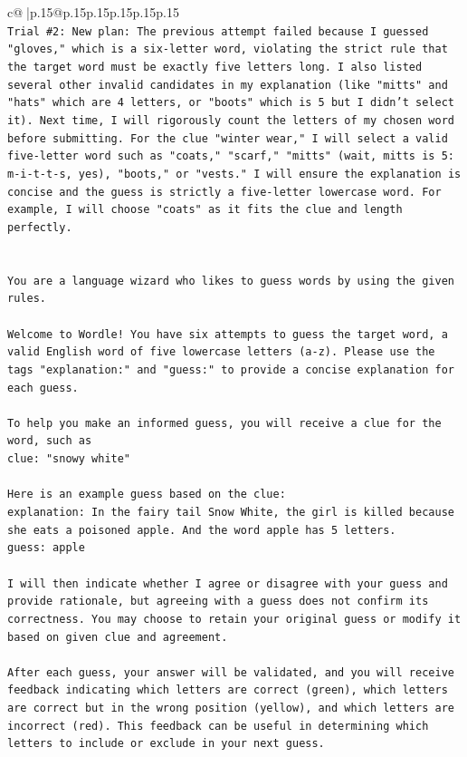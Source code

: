 \documentclass{article}
\begin{document}
{\begin{supertabular}{c@{$\;$}|p{.15\linewidth}@{}p{.15\linewidth}p{.15\linewidth}p{.15\linewidth}p{.15\linewidth}p{.15\linewidth}}
{{{\\ 
\texttt{Trial \#2: New plan: The previous attempt failed because I guessed "gloves," which is a six{-}letter word, violating the strict rule that the target word must be exactly five letters long. I also listed several other invalid candidates in my explanation (like "mitts" and "hats" which are 4 letters, or "boots" which is 5 but I didn't select it). Next time, I will rigorously count the letters of my chosen word before submitting. For the clue "winter wear," I will select a valid five{-}letter word such as "coats," "scarf," "mitts" (wait, mitts is 5: m{-}i{-}t{-}t{-}s, yes), "boots," or "vests." I will ensure the explanation is concise and the guess is strictly a five{-}letter lowercase word. For example, I will choose "coats" as it fits the clue and length perfectly.} \\
\\ 
\\ 
\texttt{You are a language wizard who likes to guess words by using the given rules.} \\
\\ 
\texttt{Welcome to Wordle! You have six attempts to guess the target word, a valid English word of five lowercase letters (a{-}z). Please use the tags "explanation:" and "guess:" to provide a concise explanation for each guess.} \\
\\ 
\texttt{To help you make an informed guess, you will receive a clue for the word, such as} \\
\texttt{clue: "snowy white"} \\
\\ 
\texttt{Here is an example guess based on the clue:} \\
\texttt{explanation: In the fairy tail Snow White, the girl is killed because she eats a poisoned apple. And the word apple has 5 letters.} \\
\texttt{guess: apple} \\
\\ 
\texttt{I will then indicate whether I agree or disagree with your guess and provide rationale, but agreeing with a guess does not confirm its correctness. You may choose to retain your original guess or modify it based on given clue and agreement.} \\
\\ 
\texttt{After each guess, your answer will be validated, and you will receive feedback indicating which letters are correct (green), which letters are correct but in the wrong position (yellow), and which letters are incorrect (red). This feedback can be useful in determining which letters to include or exclude in your next guess.} \\
}}}
\end{supertabular}}
\end{document}
